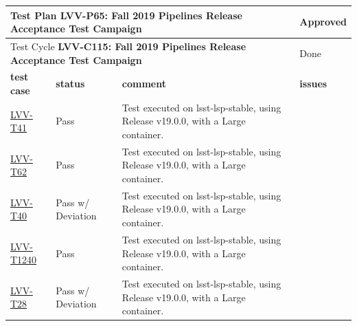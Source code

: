 \documentclass[DM,lsstdraft,STR,toc]{lsstdoc}
\begin{document}
\begin{longtable}{p{2cm}p{2.5cm}p{9cm}p{2.5cm}}
\toprule
\multicolumn{3}{l}{ Test Plan {\bf LVV-P65:  Fall 2019 Pipelines Release Acceptance Test Campaign
 }} & Approved \\\hline

  \multicolumn{3}{l}{ Test Cycle {\bf LVV-C115:  Fall 2019 Pipelines Release Acceptance Test Campaign
 }} & Done \\\hline

  {\bf \footnotesize test case} & {\bf \footnotesize status} & {\bf \footnotesize comment} & {\bf \footnotesize issues} \\\toprule

\href{https://jira.lsstcorp.org/secure/Tests.jspa#/testCase/LVV-T41}{LVV-T41}
    & Pass &
    \begin{minipage}[]{9cm}
    \smallskip
     Test executed on lsst-lsp-stable, using Release v19.0.0, with a Large
container.

    \medskip
    \end{minipage}
    &
    \\\hline
\href{https://jira.lsstcorp.org/secure/Tests.jspa#/testCase/LVV-T62}{LVV-T62}
    & Pass &
    \begin{minipage}[]{9cm}
    \smallskip
     Test executed on lsst-lsp-stable, using Release v19.0.0, with a Large
container.

    \medskip
    \end{minipage}
    &
    \\\hline
\href{https://jira.lsstcorp.org/secure/Tests.jspa#/testCase/LVV-T40}{LVV-T40}
    & Pass w/ Deviation &
    \begin{minipage}[]{9cm}
    \smallskip
     Test executed on lsst-lsp-stable, using Release v19.0.0, with a Large
container.

    \medskip
    \end{minipage}
    &
    \\\hline
\href{https://jira.lsstcorp.org/secure/Tests.jspa#/testCase/LVV-T1240}{LVV-T1240}
    & Pass &
    \begin{minipage}[]{9cm}
    \smallskip
     Test executed on lsst-lsp-stable, using Release v19.0.0, with a Large
container.

    \medskip
    \end{minipage}
    &
    \\\hline
\href{https://jira.lsstcorp.org/secure/Tests.jspa#/testCase/LVV-T28}{LVV-T28}
    & Pass w/ Deviation &
    \begin{minipage}[]{9cm}
    \smallskip
     Test executed on lsst-lsp-stable, using Release v19.0.0, with a Large
container.


\end{minipage}
\end{longtable}
\end{document}
